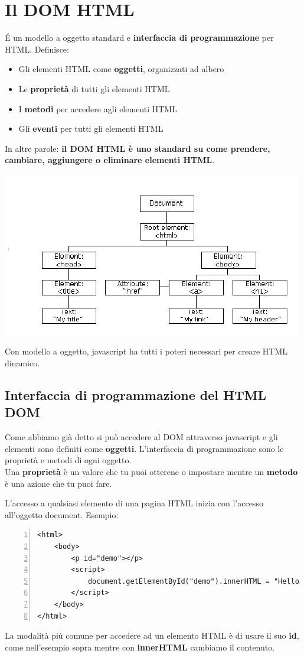 \section{Il DOM HTML} 
\'E un modello a oggetto standard e \textbf{interfaccia di programmazione} per HTML. Definisce:
\begin{itemize}
    \item Gli elementi HTML come \textbf{oggetti}, organizzati ad albero
    \item Le \textbf{proprietà} di tutti gli elementi HTML
    \item I \textbf{metodi} per accedere agli elementi HTML
    \item Gli \textbf{eventi} per tutti gli elementi HTML
\end{itemize}
In altre parole: \textbf{il DOM HTML è uno standard su come prendere, cambiare, aggiungere o eliminare elementi HTML}.
\begin{center}
    \includegraphics[scale=0.4]{Images/TecnologieWeb/8/DOM.jpg}
\end{center}
Con modello a oggetto, javascript ha tutti i poteri necessari per creare HTML dinamico.

\subsection{Interfaccia di programmazione del HTML DOM}
Come abbiamo già detto si può accedere al DOM attraverso javascript e gli elementi sono definiti come \textbf{oggetti}. L'interfaccia di programmazione sono le proprietà e metodi di ogni oggetto. \\

Una \textbf{proprietà} è un valore che tu puoi otterene o impostare mentre un \textbf{metodo} è una azione che tu puoi fare. 

L'accesso a qualsiasi elemento di una pagina HTML inizia con l'accesso all'oggetto document. Esempio:
\begin{Verbatim}[frame = single, numbers = left]
<html>
    <body>
        <p id="demo"></p>
        <script>
            document.getElementById("demo").innerHTML = "Hello World!";
        </script>
    </body>
</html>
\end{Verbatim}
La modalità più comune per accedere ad un elemento HTML è di usare il suo \textbf{id}, come nell'esempio sopra mentre con \textbf{innerHTML} cambiamo il contenuto.\\


